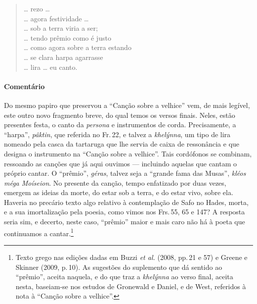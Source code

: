 \begin{verse}
\ldots{} rezo \ldots{}\\
\ldots{} agora festividade \ldots{}\\
\ldots{} sob a terra viria a ser;\\
\ldots{} tendo prêmio como é justo\\
\ldots{} como agora sobre a terra estando\\ 
\ldots{} se clara harpa agarrasse\\
\ldots{} lira \ldots{} eu canto.
\end{verse}

\medskip

{\paragraph{Comentário} Do mesmo papiro que preservou a ``Canção sobre a velhice'' vem, de mais legível, este outro novo fragmento breve, do qual temos os versos finais. Neles, estão presentes festa, o canto da \emph{persona} e instrumentos de corda. Precisamente, a ``harpa'', \emph{pâktin}, que referida no Fr.\,22, e talvez a \emph{khelýnna}, um tipo de lira nomeado pela casca da tartaruga que lhe servia de caixa de ressonância e que designa o instrumento na ``Canção sobre a velhice''.
Tais cordófonos se combinam, ressoando as canções que já aqui ouvimos --- incluindo aquelas que cantam o próprio cantar. O ``prêmio'', \emph{géras}, talvez seja a ``grande fama das Musas'', \emph{kléos méga Moíseion}. No presente da canção, tempo enfatizado por duas vezes, emergem as ideias da morte, do estar sob a terra, e do estar vivo, sobre ela. Haveria no precário texto algo relativo à contemplação de Safo no Hades, morta, e a sua imortalização pela poesia, como vimos nos Frs.\,55, 65 e 147? A resposta seria sim, e decerto, neste caso, ``prêmio'' maior e mais caro não há à poeta que continuamos a cantar.\footnote{Texto grego nas edições dadas em Buzzi \emph{et al.} (2008, pp.\,21 e 57) e Greene e Skinner (2009, p.\,10). As sugestões do suplemento que dá sentido ao ``prêmio'', aceita naquela, e do que traz a \emph{khelýnna} ao verso final, aceita nesta, baseiam-se nos estudos de Gronewald e Daniel, e de West, referidos à nota à ``Canção sobre a velhice''.}}
